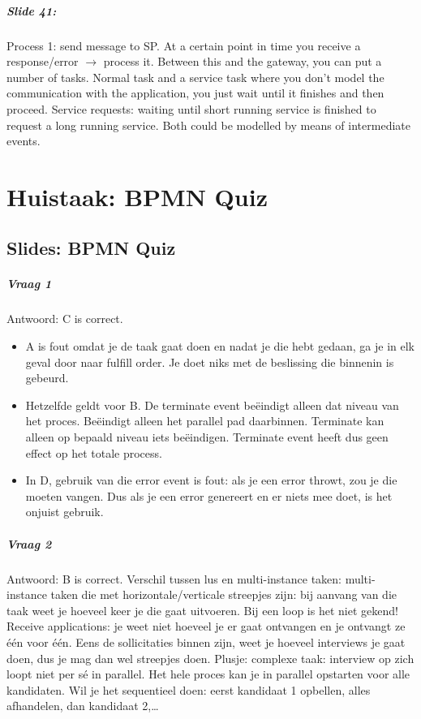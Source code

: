 \documentclass[10pt,a4paper]{report}
\begin{document}
\paragraph{Slide 41:}Process 1: send message to SP. At a certain point in time you receive a response/error $\rightarrow$ process it. Between this and the gateway, you can put a number of tasks. Normal task and a service task where you don't model the communication with the application, you just wait until it finishes and then proceed.
Service requests: waiting until short running service is finished to request a long running service.
Both could be modelled by means of intermediate events.

\chapter{Huistaak: BPMN Quiz}
\section{Slides: BPMN Quiz}

\paragraph{Vraag 1}Antwoord: C is correct.
\begin{itemize}
\item A is fout omdat je de taak gaat doen en nadat je die hebt gedaan, ga je in elk geval door naar fulfill order. Je doet niks met de beslissing die binnenin is gebeurd.
\item Hetzelfde geldt voor B. De terminate event beëindigt alleen dat niveau van het proces. Beëindigt alleen het parallel pad daarbinnen. Terminate kan alleen op bepaald niveau iets beëindigen. Terminate event heeft dus geen effect op het totale process.
\item In D, gebruik van die error event is fout: als je een error throwt, zou je die moeten vangen. Dus als je een error genereert en er niets mee doet, is het onjuist gebruik.
\end{itemize}

\paragraph{Vraag 2}Antwoord: B is correct. 
Verschil tussen lus en multi-instance taken: multi-instance taken die met horizontale/verticale streepjes zijn: bij aanvang van die taak weet je hoeveel keer je die gaat uitvoeren. Bij een loop is het niet gekend! Receive applications: je weet niet hoeveel je er gaat ontvangen en je ontvangt ze \'e\'en voor \'e\'en. Eens de sollicitaties binnen zijn, weet je hoeveel interviews je gaat doen, dus je mag dan wel streepjes doen. Plusje: complexe taak: interview op zich loopt niet per s\'e in parallel. Het hele proces kan je in parallel opstarten voor alle kandidaten. Wil je het sequentieel doen: eerst kandidaat 1 opbellen, alles afhandelen, dan kandidaat 2,…
\end{document}

